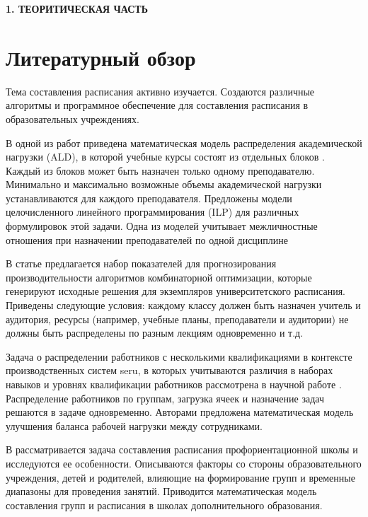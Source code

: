 \newpage
\begin{center}
  \textbf{\large 1. ТЕОРИТИЧЕСКАЯ ЧАСТЬ}
\end{center}


\section{Литературный обзор}
Тема составления расписания активно изучается. Создаются различные алгоритмы и программное обеспечение для составления расписания в образовательных учреждениях.

В одной из работ приведена математическая модель распределения академической нагрузки (ALD), в которой учебные курсы состоят из отдельных блоков  \cite{zaozerskaya2018modeling}. Каждый из блоков может быть назначен только одному преподавателю. Минимально и максимально возможные объемы академической нагрузки устанавливаются для каждого преподавателя. Предложены модели целочисленного линейного программирования (ILP) для различных формулировок этой задачи. Одна из моделей учитывает межличностные отношения при назначении преподавателей по одной дисциплине

В статье \cite{delaRosaRivera2020} предлагается набор показателей для прогнозирования производительности алгоритмов комбинаторной оптимизации, которые генерируют исходные решения для экземпляров университетского расписания. Приведены следующие условия: каждому классу должен быть назначен учитель и аудитория, ресурсы (например, учебные планы, преподаватели и аудитории) не должны быть распределены по разным лекциям одновременно и т.д.

Задача о распределении работников с несколькими квалификациями в контексте производственных систем seru, в которых учитываются различия в наборах навыков и уровнях квалификации работников рассмотрена в научной работе \cite{Lian2018}. Распределение работников по группам, загрузка ячеек и назначение задач решаются в задаче одновременно. Авторами предложена математическая модель улучшения баланса рабочей нагрузки между сотрудниками.

В \cite{zakharova2022integer} рассматривается задача составления расписания профориентационной школы и исследуются ее особенности. Описываются факторы со стороны образовательного учреждения, детей и родителей, влияющие на формирование групп и временные диапазоны для проведения занятий. Приводится математическая модель составления групп и расписания в школах дополнительного образования.


